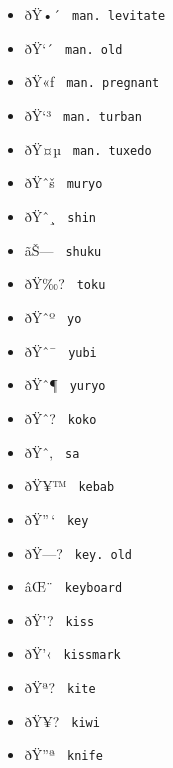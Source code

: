 \begin{itemize}
\item
  \label{symbol-man.levitate}{{ ðŸ•´ }
  \texttt{\ man.\ levitate\ }}
\item
  \label{symbol-man.old}{{ ðŸ`´ } \texttt{\ man.\ old\ }}
\item
  \label{symbol-man.pregnant}{{ ðŸ«ƒ }
  \texttt{\ man.\ pregnant\ }}
\item
  \label{symbol-man.turban}{{ ðŸ`³ }
  \texttt{\ man.\ turban\ }}
\item
  \label{symbol-man.tuxedo}{{ ðŸ¤µ }
  \texttt{\ man.\ tuxedo\ }}
\item
  \label{symbol-muryo}{{ ðŸˆš } \texttt{\ muryo\ }}
\item
  \label{symbol-shin}{{ ðŸˆ¸ } \texttt{\ shin\ }}
\item
  \label{symbol-shuku}{{ ãŠ--- } \texttt{\ shuku\ }}
\item
  \label{symbol-toku}{{ ðŸ‰? } \texttt{\ toku\ }}
\item
  \label{symbol-yo}{{ ðŸˆº } \texttt{\ yo\ }}
\item
  \label{symbol-yubi}{{ ðŸˆ¯ } \texttt{\ yubi\ }}
\item
  \label{symbol-yuryo}{{ ðŸˆ¶ } \texttt{\ yuryo\ }}
\item
  \label{symbol-koko}{{ ðŸˆ? } \texttt{\ koko\ }}
\item
  \label{symbol-sa}{{ ðŸˆ‚ } \texttt{\ sa\ }}
\item
  \label{symbol-kebab}{{ ðŸ¥™ } \texttt{\ kebab\ }}
\item
  \label{symbol-key}{{ ðŸ''\,` } \texttt{\ key\ }}
\item
  \label{symbol-key.old}{{ ðŸ---? }
  \texttt{\ key.\ old\ }}
\item
  \label{symbol-keyboard}{{ âŒ¨ } \texttt{\ keyboard\ }}
\item
  \label{symbol-kiss}{{ ðŸ'? } \texttt{\ kiss\ }}
\item
  \label{symbol-kissmark}{{ ðŸ'‹ } \texttt{\ kissmark\ }}
\item
  \label{symbol-kite}{{ ðŸª? } \texttt{\ kite\ }}
\item
  \label{symbol-kiwi}{{ ðŸ¥? } \texttt{\ kiwi\ }}
\item
  \label{symbol-knife}{{ ðŸ''ª } \texttt{\ knife\ }}

\end{itemize}
